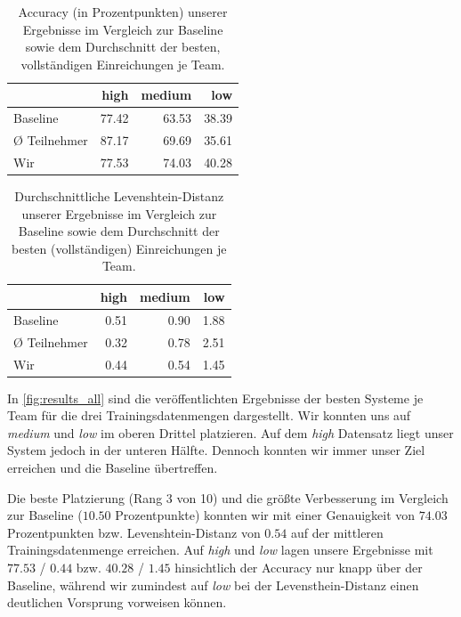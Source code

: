 \documentclass[11pt,a4paper]{article}
\begin{document}
\begin{table}
\centering
\begin{tabular}{lrrr}
\toprule
                 & high   & medium & low    \\
                 \midrule
Baseline         & 77.42 & 63.53 & 38.39 \\
Ø Teilnehmer     & 87.17 & 69.69 & 35.61 \\
Wir              & 77.53 & 74.03 & 40.28 \\
\bottomrule
\end{tabular}
\caption{Accuracy (in Prozentpunkten) unserer Ergebnisse im Vergleich zur Baseline sowie dem Durchschnitt der besten, vollständigen Einreichungen je Team.}
\label{fig:acc_comparison}
\end{table}

\begin{table}
\centering
\begin{tabular}{lrrr}
\toprule
         & high & medium & low  \\
         \midrule
Baseline     & 0.51 & 0.90   & 1.88 \\
Ø Teilnehmer & 0.32 & 0.78   & 2.51 \\
Wir          & 0.44 & 0.54   & 1.45\\
\bottomrule
\end{tabular}
\caption{Durchschnittliche Levenshtein-Distanz unserer Ergebnisse im Vergleich zur Baseline sowie dem Durchschnitt der besten (vollständigen) Einreichungen je Team.}
\label{fig:lev_comparison}
\end{table}

In \autoref{fig:results_all} sind die veröffentlichten Ergebnisse der besten Systeme je Team für die drei Trainingsdatenmengen dargestellt. Wir konnten uns auf \textit{medium} und \textit{low} im oberen Drittel platzieren. Auf dem \textit{high} Datensatz liegt unser System jedoch in der unteren Hälfte. Dennoch konnten wir immer unser Ziel erreichen und  die Baseline übertreffen.

Die beste Platzierung (Rang 3 von 10) und die größte Verbesserung im Vergleich zur Baseline ($10.50$ Prozentpunkte) konnten wir mit einer Genauigkeit von $74.03$ Prozentpunkten bzw. Levenshtein-Distanz von $0.54$ auf der mittleren Trainingsdatenmenge erreichen.
Auf \textit{high} und \textit{low} lagen unsere Ergebnisse mit $77.53$ / $0.44$ bzw. $40.28$ / $1.45$ hinsichtlich der Accuracy nur knapp über der Baseline, während wir zumindest auf \textit{low} bei der Levensthein-Distanz einen deutlichen Vorsprung vorweisen können.
\end{document}
